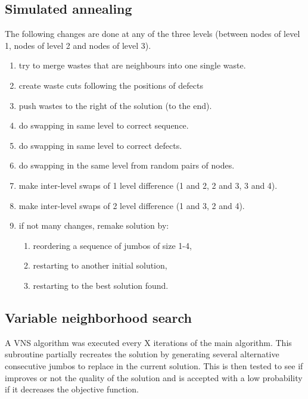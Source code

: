 \documentclass{roadef}
\begin{document}
    \subsection{Simulated annealing}

        The following changes are done at any of the three levels (between nodes of level 1, nodes of level 2 and nodes of level 3).

        \begin{enumerate}

            \item try to merge wastes that are neighbours into one single waste.
            \item create waste cuts following the positions of defects
            \item push wastes to the right of the solution (to the end).
            \item do swapping in same level to correct sequence.
            \item do swapping in same level to correct defects.
            \item do swapping in the same level from random pairs of nodes.
            \item make inter-level swaps of 1 level difference (1 and 2, 2 and 3, 3 and 4).
            \item make inter-level swaps of 2 level difference (1 and 3, 2 and 4).
            \item if not many changes, remake solution by:

            \begin{enumerate}
                \item reordering a sequence of jumbos of size 1-4, 
                \item restarting to another initial solution,
                \item restarting to the best solution found.
            \end{enumerate}

        \end{enumerate}

    \subsection{Variable neighborhood search}

        A VNS algorithm was executed every X iterations of the main algorithm. This subroutine partially recreates the solution by generating several alternative consecutive jumbos to replace in the current solution. This is then tested to see if improves or not the quality of the solution and is accepted with a low probability if it decreases the objective function.
\end{document}
